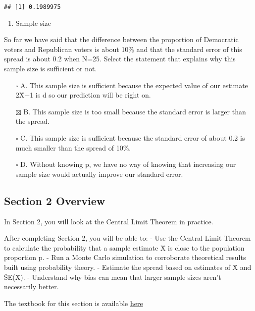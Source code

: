 \documentclass[
]{article}
\providecommand{\tightlist}{%
  \setlength{\itemsep}{0pt}\setlength{\parskip}{0pt}}
\begin{document}
\begin{verbatim}
## [1] 0.1989975
\end{verbatim}

\begin{enumerate}
\def\labelenumi{\arabic{enumi}.}
\setcounter{enumi}{9}
\tightlist
\item
  Sample size
\end{enumerate}

So far we have said that the difference between the proportion of
Democratic voters and Republican voters is about 10\% and that the
standard error of this spread is about 0.2 when N=25. Select the
statement that explains why this sample size is sufficient or not.

\begin{itemize}
\tightlist
\item[$\square$]
  A. This sample size is sufficient because the expected value of our
  estimate 2X̄−1 is d so our prediction will be right on.
\item[$\boxtimes$]
  B. This sample size is too small because the standard error is larger
  than the spread.
\item[$\square$]
  C. This sample size is sufficient because the standard error of about
  0.2 is much smaller than the spread of 10\%.
\item[$\square$]
  D. Without knowing p, we have no way of knowing that increasing our
  sample size would actually improve our standard error.
\end{itemize}

\hypertarget{section-2-overview}{%
\subsection{Section 2 Overview}\label{section-2-overview}}

In Section 2, you will look at the Central Limit Theorem in practice.

After completing Section 2, you will be able to: - Use the Central Limit
Theorem to calculate the probability that a sample estimate X̄ is close
to the population proportion p. - Run a Monte Carlo simulation to
corroborate theoretical results built using probability theory. -
Estimate the spread based on estimates of X̄ and ŜE(X̄). - Understand why
bias can mean that larger sample sizes aren't necessarily better.

The textbook for this section is available
\href{https://rafalab.github.io/dsbook/random-variables.html\#central-limit-theorem}{here}
\end{document}
